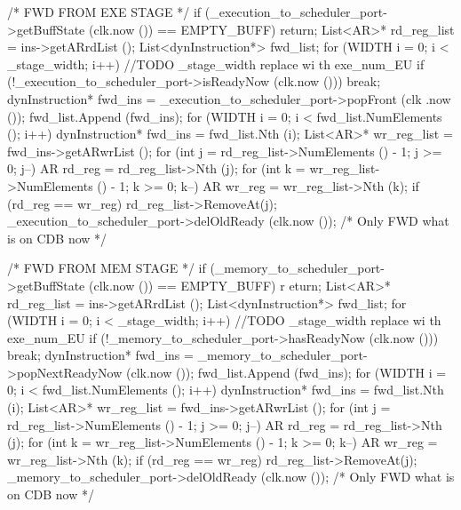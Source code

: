 \begin{DoxyCode}
                                                                  {
    { /* FWD FROM EXE STAGE */
        if (_execution_to_scheduler_port->getBuffState (clk.now ()) == 
      EMPTY_BUFF) return;
        List<AR>* rd_reg_list = ins->getARrdList ();
        List<dynInstruction*> fwd_list;
        for (WIDTH i = 0; i < _stage_width; i++) { //TODO _stage_width replace wi
      th exe_num_EU
            if (!_execution_to_scheduler_port->isReadyNow (clk.now ())) break;
            dynInstruction* fwd_ins = _execution_to_scheduler_port->popFront (clk
      .now ());
            fwd_list.Append (fwd_ins);
        }
        for (WIDTH i = 0; i < fwd_list.NumElements (); i++) {
            dynInstruction* fwd_ins = fwd_list.Nth (i);
            List<AR>* wr_reg_list = fwd_ins->getARwrList ();
            for (int j = rd_reg_list->NumElements () - 1; j >= 0; j--) {
                AR rd_reg = rd_reg_list->Nth (j);
                for (int k = wr_reg_list->NumElements () - 1; k >= 0; k--) {
                    AR wr_reg = wr_reg_list->Nth (k);
                    if (rd_reg == wr_reg) {
                        rd_reg_list->RemoveAt(j);
                    }
                }
            }
        }
        _execution_to_scheduler_port->delOldReady (clk.now ()); /* Only FWD what 
      is on CDB now */
    }

    { /* FWD FROM MEM STAGE */
        if (_memory_to_scheduler_port->getBuffState (clk.now ()) == EMPTY_BUFF) r
      eturn;
        List<AR>* rd_reg_list = ins->getARrdList ();
        List<dynInstruction*> fwd_list;
        for (WIDTH i = 0; i < _stage_width; i++) { //TODO _stage_width replace wi
      th exe_num_EU
            if (!_memory_to_scheduler_port->hasReadyNow (clk.now ())) break;
            dynInstruction* fwd_ins = _memory_to_scheduler_port->popNextReadyNow 
      (clk.now ());
            fwd_list.Append (fwd_ins);
        }
        for (WIDTH i = 0; i < fwd_list.NumElements (); i++) {
            dynInstruction* fwd_ins = fwd_list.Nth (i);
            List<AR>* wr_reg_list = fwd_ins->getARwrList ();
            for (int j = rd_reg_list->NumElements () - 1; j >= 0; j--) {
                AR rd_reg = rd_reg_list->Nth (j);
                for (int k = wr_reg_list->NumElements () - 1; k >= 0; k--) {
                    AR wr_reg = wr_reg_list->Nth (k);
                    if (rd_reg == wr_reg) {
                        rd_reg_list->RemoveAt(j);
                    }
                }
            }
        }
        _memory_to_scheduler_port->delOldReady (clk.now ()); /* Only FWD what is 
      on CDB now */
    }
}
\end{DoxyCode}


